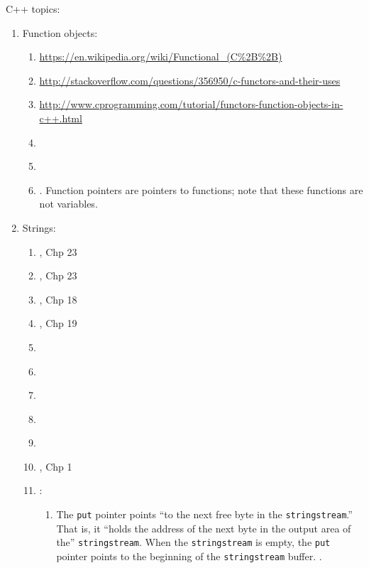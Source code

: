 C++ topics: \vspace{-0.3cm}
\begin{enumerate} \itemsep -4pt
\item Function objects: \vspace{-0.3cm}
	\begin{enumerate} \itemsep -2pt
	\item \url{https://en.wikipedia.org/wiki/Functional_(C%2B%2B)}
	\item \url{http://stackoverflow.com/questions/356950/c-functors-and-their-uses}
	\item \url{http://www.cprogramming.com/tutorial/functors-function-objects-in-c++.html}
	\item \cite[pp. 233--243]{Josuttis2012}
	\item \cite[pp. 327--332, 885, 922--931, 947]{Prata2005}
	\item \cite[pp. 126--129]{Schildt1998a}. Function pointers are pointers to functions; note that these functions are not variables.
	\end{enumerate}
\item Strings: \vspace{-0.3cm}
	\begin{enumerate} \itemsep -2pt
	\item \cite{Stroustrup2014}, Chp 23
	\item \cite{Stroustrup2009}, Chp 23
	\item \cite{Gregoire2014}, Chp 18
	\item \cite{Allain2012}, Chp 19
	\item \cite[pp. 56--60, string data types, variable vs. literal; strings and string class, 13, 82--87, 320--324, 363--365, 496]{Horstmann2012}
	\item \cite[655--716]{Josuttis2012}
	\item \cite[pp. 64--67, 320--325, 465--482]{Savitch2009}
	\item \cite[\S14.2]{Scheinerman2006}
	\item \cite[pp. 114--131]{Prata2005}
	\item \cite{Eckel2003}, Chp 1
	\item \cite{Heller2003}: \vspace{-0.2cm}
		\begin{enumerate} \itemsep -2pt
		\item The {\tt put} pointer points ``to the next free byte in the {\tt stringstream}.'' That is, it ``holds the address of the next byte in the output area of the'' {\tt stringstream}. When the {\tt stringstream} is empty, the {\tt put} pointer points to the beginning of the {\tt stringstream} buffer. \cite[\S9.8]{Heller2003}.

\end{enumerate}
\end{enumerate}
\end{enumerate}
